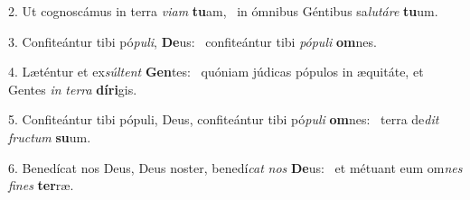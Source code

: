 2. Ut cognoscámus in terra \textit{vi}\textit{am} \textbf{tu}am, \ast\  in ómnibus Géntibus sa\textit{lu}\textit{tá}\textit{re} \textbf{tu}um.\

3. Confiteántur tibi pó\textit{pu}\textit{li}, \textbf{De}us: \ast\  confiteántur tibi \textit{pó}\textit{pu}\textit{li} \textbf{om}nes.\

4. Læténtur et ex\textit{súl}\textit{tent} \textbf{Gen}tes: \ast\  quóniam júdicas pópulos in æquitáte, et Gentes \textit{in} \textit{ter}\textit{ra} \textbf{dí}\textbf{ri}gis.\

5. Confiteántur tibi pópuli, Deus, confiteántur tibi pó\textit{pu}\textit{li} \textbf{om}nes: \ast\  terra de\textit{dit} \textit{fruc}\textit{tum} \textbf{su}um.\

6. Benedícat nos Deus, Deus noster, benedí\textit{cat} \textit{nos} \textbf{De}us: \ast\  et métuant eum om\textit{nes} \textit{fi}\textit{nes} \textbf{ter}ræ.\

